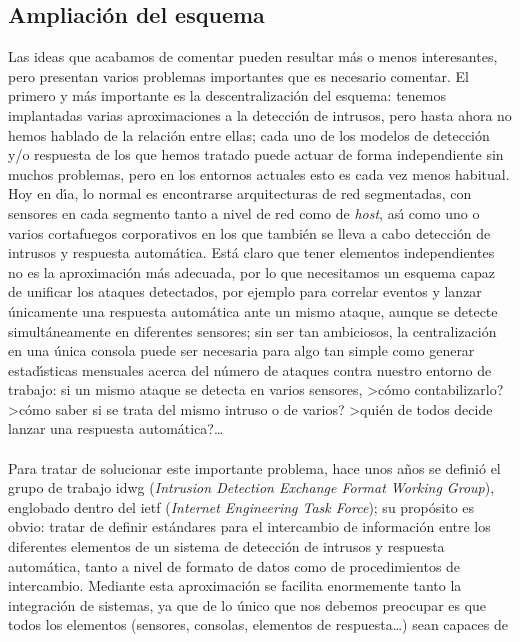 \subsection{Ampliaci\'on del esquema}
Las ideas que acabamos de comentar pueden resultar m\'as o menos interesantes,
pero presentan varios problemas importantes que es necesario comentar. El 
primero y m\'as importante es la descentralizaci\'on del esquema: tenemos 
implantadas varias aproximaciones a la detecci\'on de intrusos, pero hasta ahora
no hemos hablado de la relaci\'on entre ellas; cada uno de los modelos de
detecci\'on y/o respuesta de los que hemos tratado puede actuar de forma
independiente sin muchos problemas, pero en los entornos actuales esto es cada
vez menos habitual. Hoy en d\'{\i}a, lo normal es encontrarse arquitecturas de
red segmentadas, con sensores en cada segmento tanto a nivel de red como de
{\it host}, as\'{\i} como uno o varios cortafuegos corporativos en los que 
tambi\'en se lleva a cabo detecci\'on de intrusos y respuesta autom\'atica. 
Est\'a claro que tener elementos independientes no es la aproximaci\'on m\'as
adecuada, por lo que necesitamos un esquema capaz de unificar los ataques 
detectados, por ejemplo para correlar eventos y lanzar \'unicamente una 
respuesta autom\'atica ante un mismo ataque, aunque se detecte simult\'aneamente
en diferentes sensores; sin ser tan ambiciosos, la centralizaci\'on en una
\'unica consola puede ser necesaria para algo tan simple como generar 
estad\'{\i}sticas mensuales acerca del n\'umero de ataques contra nuestro 
entorno de trabajo: si un mismo ataque se detecta en varios sensores, >c\'omo
contabilizarlo? >c\'omo saber si se trata del mismo intruso o de varios? 
>qui\'en de todos decide lanzar una respuesta autom\'atica?\ldots\\ 
\\Para tratar de solucionar este importante problema, hace unos a\~nos se 
defini\'o el grupo de trabajo {\sc idwg} ({\it Intrusion Detection Exchange
Format Working Group}), englobado dentro del {\sc ietf} ({\it Internet 
Engineering Task Force}); su prop\'osito es obvio: tratar de definir 
est\'andares para el intercambio de informaci\'on entre los diferentes 
elementos de un sistema de detecci\'on de intrusos y respuesta autom\'atica,
tanto a nivel de formato de datos como de procedimientos de intercambio. 
Mediante esta aproximaci\'on se facilita enormemente tanto la integraci\'on de 
sistemas, ya que de lo \'unico que nos debemos preocupar es que todos los 
elementos (sensores, consolas, elementos de respuesta\ldots) sean capaces de 
